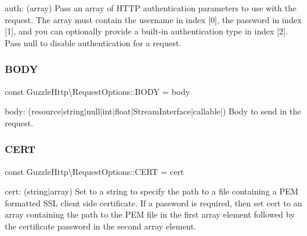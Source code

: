 auth\+: (array) Pass an array of H\+T\+TP authentication parameters to use with the request. The array must contain the username in index \mbox{[}0\mbox{]}, the password in index \mbox{[}1\mbox{]}, and you can optionally provide a built-\/in authentication type in index \mbox{[}2\mbox{]}. Pass null to disable authentication for a request. \mbox{\label{classGuzzleHttp_1_1RequestOptions_ab4288a653aa6c7e705a526467ff604c6}} 
\subsubsection{\texorpdfstring{B\+O\+DY}{BODY}}
{\footnotesize\ttfamily const Guzzle\+Http\textbackslash{}\+Request\+Options\+::\+B\+O\+DY = \textquotesingle{}body\textquotesingle{}}

body\+: (resource$\vert$string$\vert$null$\vert$int$\vert$float$\vert$\+Stream\+Interface$\vert$callable$\vert$) Body to send in the request. \mbox{\label{classGuzzleHttp_1_1RequestOptions_a9e1d557973fcd84a1167d42160e597ff}} 
\subsubsection{\texorpdfstring{C\+E\+RT}{CERT}}
{\footnotesize\ttfamily const Guzzle\+Http\textbackslash{}\+Request\+Options\+::\+C\+E\+RT = \textquotesingle{}cert\textquotesingle{}}

cert\+: (string$\vert$array) Set to a string to specify the path to a file containing a P\+EM formatted S\+SL client side certificate. If a password is required, then set cert to an array containing the path to the P\+EM file in the first array element followed by the certificate password in the second array element. \mbox{\label{classGuzzleHttp_1_1RequestOptions_a71d2b2161d9effbee1127fc30556d642}} 
